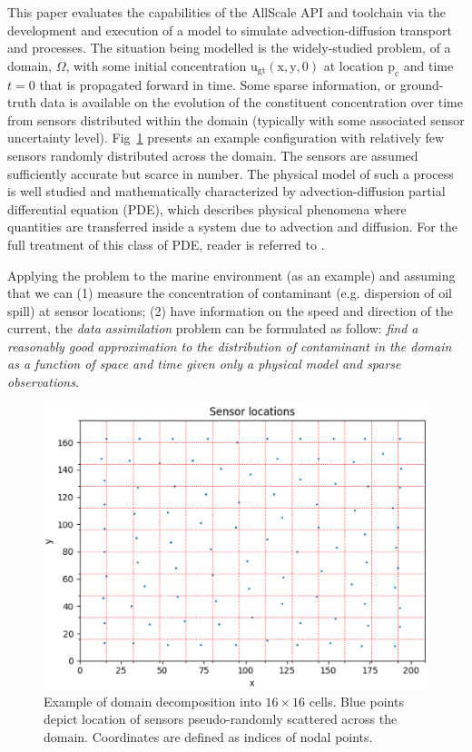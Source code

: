 \documentclass[acmsmall,review,anonymous]{acmart}\settopmatter{printfolios=true,printccs=false,printacmref=false}
\begin{document}
This paper evaluates the capabilities of the AllScale API and toolchain via the development and execution of a model to simulate advection-diffusion transport and processes. The situation being modelled is the widely-studied problem, of a domain, $\Omega$, with some initial concentration $\mathrm{u_{gt}(x,y,0)}$ at location $\mathrm{p_c}$ and time $t=0$ that is propagated forward in time. Some sparse information, or ground-truth data is available on the evolution of the constituent concentration over time from sensors distributed within the domain (typically with some associated sensor uncertainty level). Fig~\ref{fig:sensors} presents an example configuration with relatively few sensors randomly distributed across the domain. The sensors are assumed sufficiently accurate but scarce in number. The physical model of such a process is well studied and mathematically characterized by advection-diffusion partial differential equation (PDE), which describes physical phenomena where quantities are transferred inside a system due to advection and diffusion. For the full treatment of this class of PDE, reader is referred to \cite{Hundsdorfer03}.

Applying the problem to the marine environment (as an example) and assuming that we can (1) measure the concentration of contaminant (e.g. dispersion of oil spill) at sensor locations; (2) have information on the speed and direction of the current, the \textit{data assimilation} problem can be formulated as follow: \textit{find a reasonably good approximation to the distribution of contaminant in the domain as a function of space and time given only a physical model and sparse observations}.

\begin{figure}
\includegraphics[scale=0.5]{images/sensors-Nx208-Ny176}
\caption{Example of domain decomposition into ${16{\times}16}$ cells. Blue points depict location of sensors pseudo-randomly scattered across the domain. Coordinates are defined as indices of nodal points.}
\label{fig:sensors}
\end{figure}
\end{document}
